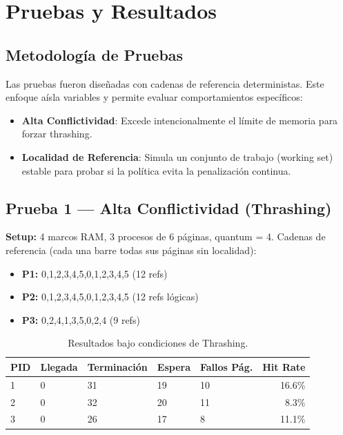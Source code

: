 \documentclass[12pt,letterpaper]{article}
\begin{document}
\newpage
\section{Pruebas y Resultados}

\subsection{Metodología de Pruebas}
Las pruebas fueron diseñadas con cadenas de referencia deterministas.
Este enfoque aísla variables y permite evaluar comportamientos específicos:
\begin{itemize}
    \item \textbf{Alta Conflictividad}: Excede intencionalmente el límite de memoria para forzar thrashing.
\item \textbf{Localidad de Referencia}: Simula un conjunto de trabajo (working set) estable para probar si la política evita la penalización continua.
\end{itemize}

\subsection{Prueba 1 --- Alta Conflictividad (Thrashing)}
\textbf{Setup:} 4 marcos RAM, 3 procesos de 6 páginas, quantum = 4.
Cadenas de referencia (cada una barre todas sus páginas sin localidad):
\begin{itemize}
    \item \textbf{P1:} 0,1,2,3,4,5,0,1,2,3,4,5 (12 refs)
    \item \textbf{P2:} 0,1,2,3,4,5,0,1,2,3,4,5 (12 refs lógicas)
    \item \textbf{P3:} 0,2,4,1,3,5,0,2,4 (9 refs)
\end{itemize}

\begin{table}[H]
\centering
{}
\begin{tabular}{@{}lllllr@{}}
\toprule
\rowcolor{catBlue!40}
\textbf{PID} & \textbf{Llegada} & \textbf{Terminación} & \textbf{Espera} & \textbf{Fallos Pág.} & \textbf{Hit Rate} \\ \midrule
1 & 0 & 31 & 19 & 10 & 16.6\% \\
2 & 0 & 32 & 20 & 11 & 8.3\% \\
3 & 0 & 26 & 17 & 8 & 11.1\% \\ \bottomrule
\end{tabular}
\caption{Resultados bajo condiciones de Thrashing.}
\end{table}
\end{document}
